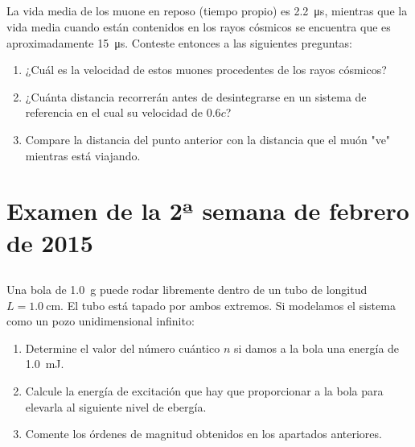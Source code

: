 \documentclass[12pt]{article}
\begin{document}
        \subsection{}
        La vida media de los muone en reposo (tiempo propio) es \SI{2.2}{\micro\second}, mientras
        que la vida media cuando están contenidos en los rayos cósmicos se encuentra que es aproximadamente
        \SI{15}{\micro\second}. Conteste entonces a las siguientes preguntas:
        \begin{enumerate}[label=\alph*)]
        \item ¿Cuál es la velocidad de estos muones procedentes de los rayos cósmicos?
        \item ¿Cuánta distancia recorrerán antes de desintegrarse en un sistema de referencia
        en el cual su velocidad de $\num{0.6}c$?
        \item Compare la distancia del punto anterior con la distancia que el muón "ve"
        mientras está viajando.
    \end{enumerate}


    \section*{Examen de la 2ª semana de febrero de 2015}
    \setcounter{subsection}{0}
    \subsection{}
    Una bola de \SI{1.0}{\gram} puede rodar libremente dentro de un tubo de longitud $L=\SI{1.0}{\centi\meter}$.
    El tubo está tapado por ambos extremos. Si modelamos el sistema como un pozo unidimensional infinito:
    \begin{enumerate}[label=\alph*)]
        \item Determine el valor del número cuántico $n$ si damos a la bola una energía de \SI{1.0}{\milli\J}.
        \item Calcule la energía de excitación que hay que proporcionar a la bola para elevarla al siguiente nivel
        de ebergía.
        \item Comente los órdenes de magnitud obtenidos en los apartados anteriores.
    \end{enumerate}
\end{document}
